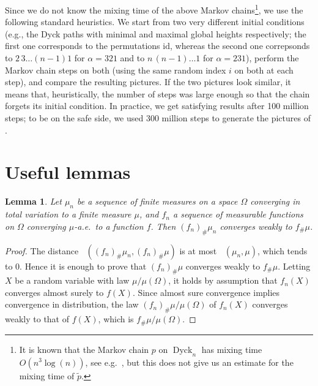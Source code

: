 \documentclass[a4paper,11pt]{amsart}
\DeclareMathOperator{\dTV}{d_{TV}}
\DeclareMathOperator{\Dyck}{Dyck}
\newtheorem{lem}[thm]{Lemma}
\theoremstyle{definition}
\begin{document}
Since we do not know the mixing time of the above Markov chains\footnote{
   It is known that the Markov chain $p$ on $\Dyck_n$ has mixing time $O(n^3 \log(n))$, see e.g.~\cite{mcshine1997mixing,wilson2004mixing}, but this does not give us an estimate for the mixing time of $\tilde p$.
}, we use the following standard heuristics.
We start from two very different initial conditions (e.g., the Dyck paths with minimal and maximal global heights respectively; the first one corresponds to the permutations $\mathrm{id}$, whereas the second one correpsonds to $2\,3\dots(n-1)1$ for $\alpha=321$ and to $n\,(n-1)\dots1$ for $\alpha=231$), 
perform the Markov chain steps on both (using the same random index $i$ on both at each step),
and compare the resulting pictures.
If the two pictures look similar, it means that, heuristically, the number of steps was large enough so that the chain forgets its initial condition.
In practice, we get satisfying results after 100 million steps;
to be on the safe side, we
used 300 million steps to generate the pictures of .


\section{Useful lemmas}\label{sec:appendix}

\begin{lem}\label{lem:cv_push_forward}
    Let $\mu_n$ be a sequence of finite measures on a space $\Omega$ converging in total variation to a finite measure $\mu$,
    and $f_n$ a sequence of measurable functions on $\Omega$ converging $\mu$-a.e.~to a function $f$.
    Then $(f_n)_{\#}\mu_n$ converges weakly to $f_{\#}\mu$.
\end{lem}
\begin{proof}
    The distance $\dTV( (f_n)_{\#}\mu_n, (f_n)_{\#}\mu)$ is at most $\dTV(\mu_n,\mu)$, which tends to $0$.
    Hence it is enough to prove that $(f_n)_{\#}\mu$ converges weakly to $f_{\#}\mu$.
    Letting $X$ be a random variable with law $\mu/\mu(\Omega)$, it holds by assumption that $f_n(X)$ converges almost surely to $f(X)$.
    Since almost sure convergence implies convergence in distribution, the law $(f_n)_{\#}\mu/\mu(\Omega)$ of $f_n(X)$ converges weakly to that of $f(X)$, which is $f_{\#}\mu/\mu(\Omega)$.
\end{proof}
\end{document}
